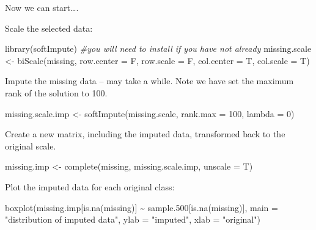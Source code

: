 \documentclass[
]{book}
\newenvironment{Shaded}{\begin{snugshade}}{\end{snugshade}}
\newcommand{\AttributeTok}[1]{\textcolor[rgb]{0.77,0.63,0.00}{#1}}
\newcommand{\CommentTok}[1]{\textcolor[rgb]{0.56,0.35,0.01}{\textit{#1}}}
\newcommand{\DecValTok}[1]{\textcolor[rgb]{0.00,0.00,0.81}{#1}}
\newcommand{\FloatTok}[1]{\textcolor[rgb]{0.00,0.00,0.81}{#1}}
\newcommand{\FunctionTok}[1]{\textcolor[rgb]{0.00,0.00,0.00}{#1}}
\newcommand{\NormalTok}[1]{#1}
\newcommand{\OtherTok}[1]{\textcolor[rgb]{0.56,0.35,0.01}{#1}}
\newcommand{\SpecialCharTok}[1]{\textcolor[rgb]{0.00,0.00,0.00}{#1}}
\newcommand{\StringTok}[1]{\textcolor[rgb]{0.31,0.60,0.02}{#1}}
\begin{document}
Now we can start\ldots.

Scale the selected data:

\begin{Shaded}
\begin{Highlighting}[]
\FunctionTok{library}\NormalTok{(softImpute)  }\CommentTok{\#you will need to install if you have not already}
\NormalTok{missing.scale }\OtherTok{\textless{}{-}} \FunctionTok{biScale}\NormalTok{(missing, }\AttributeTok{row.center =}\NormalTok{ F, }\AttributeTok{row.scale =}\NormalTok{ F, }
    \AttributeTok{col.center =}\NormalTok{ T, }\AttributeTok{col.scale =}\NormalTok{ T)}
\end{Highlighting}
\end{Shaded}

Impute the missing data -- may take a while. Note we have set the maximum rank of the solution to 100.

\begin{Shaded}
\begin{Highlighting}[]
\NormalTok{missing.scale.imp }\OtherTok{\textless{}{-}} \FunctionTok{softImpute}\NormalTok{(missing.scale, }\AttributeTok{rank.max =} \DecValTok{100}\NormalTok{, }
    \AttributeTok{lambda =} \DecValTok{0}\NormalTok{)}
\end{Highlighting}
\end{Shaded}

Create a new matrix, including the imputed data, transformed back to the original scale.

\begin{Shaded}
\begin{Highlighting}[]
\NormalTok{missing.imp }\OtherTok{\textless{}{-}} \FunctionTok{complete}\NormalTok{(missing, missing.scale.imp, }\AttributeTok{unscale =}\NormalTok{ T)}
\end{Highlighting}
\end{Shaded}

Plot the imputed data for each original class:

\begin{Shaded}
\begin{Highlighting}[]
\FunctionTok{boxplot}\NormalTok{(missing.imp[}\FunctionTok{is.na}\NormalTok{(missing)] }\SpecialCharTok{\textasciitilde{}}\NormalTok{ sample}\FloatTok{.500}\NormalTok{[}\FunctionTok{is.na}\NormalTok{(missing)], }
    \AttributeTok{main =} \StringTok{"distribution of imputed data"}\NormalTok{, }\AttributeTok{ylab =} \StringTok{"imputed"}\NormalTok{, }
    \AttributeTok{xlab =} \StringTok{"original"}\NormalTok{)}
\end{Highlighting}
\end{Shaded}
\end{document}
